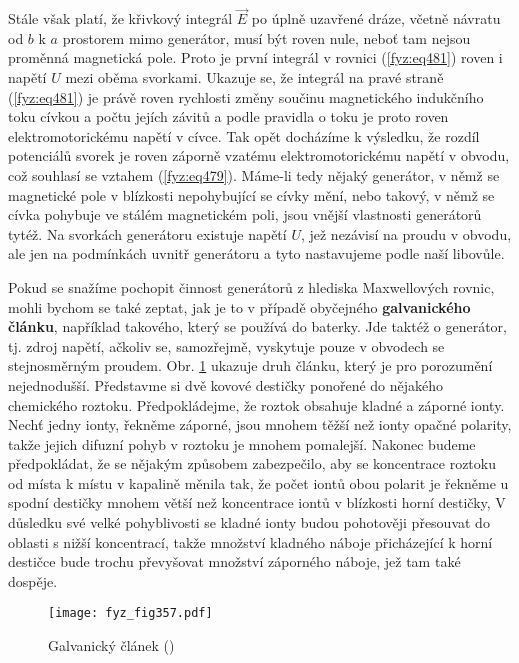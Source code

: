   Stále však platí, že křivkový integrál \(\vec{E}\) po úplně uzavřené dráze, včetně návratu od 
  \(b\) k \(a\) prostorem mimo generátor, musí být roven nule, neboť tam nejsou proměnná magnetická 
  pole. Proto je první integrál v rovnici (\ref{fyz:eq481}) roven i napětí \(U\) mezi oběma 
  svorkami. Ukazuje se, že integrál na pravé straně (\ref{fyz:eq481}) je právě roven rychlosti 
  změny součinu magnetického indukčního toku cívkou a počtu jejích závitů a podle pravidla o toku 
  je proto roven elektromotorickému napětí v cívce. Tak opět docházíme k výsledku, že rozdíl 
  potenciálů svorek je roven záporně vzatému elektromotorickému napětí v obvodu, což souhlasí se 
  vztahem (\ref{fyz:eq479}). Máme-li tedy nějaký generátor, v němž se magnetické pole v blízkosti 
  nepohybující se cívky mění, nebo takový, v němž se cívka pohybuje ve stálém magnetickém poli, 
  jsou vnější vlastnosti generátorů tytéž. Na svorkách generátoru existuje napětí \(U\), jež 
  nezávisí na proudu v obvodu, ale jen na podmínkách uvnitř generátoru a tyto nastavujeme podle 
  naší libovůle. 
  
  Pokud se snažíme pochopit činnost generátorů z hlediska Maxwellových rovnic, mohli bychom se také 
  zeptat, jak je to v případě obyčejného \textbf{galvanického článku}, například takového, který se 
  používá do baterky. Jde taktéž o generátor, tj. zdroj napětí, ačkoliv se, samozřejmě, vyskytuje 
  pouze v obvodech se stejnosměrným proudem. Obr. \ref{fyz:fig357} ukazuje druh článku, který je 
  pro porozumění nejednodušší. Představme si dvě kovové destičky ponořené do nějakého chemického 
  roztoku. Předpokládejme, že roztok obsahuje kladné a záporné ionty. Nechť jedny ionty, řekněme 
  záporné, jsou mnohem těžší než ionty opačné polarity, takže jejich difuzní pohyb v roztoku je 
  mnohem pomalejší. Nakonec budeme předpokládat, že se nějakým způsobem zabezpečilo, aby se 
  koncentrace roztoku od místa k místu v kapalině měnila tak, že počet iontů obou polarit je 
  řekněme u spodní destičky mnohem větší než koncentrace iontů v blízkosti horní destičky, V 
  důsledku své velké pohyblivosti se kladné ionty budou pohotověji přesouvat do oblasti s nižší 
  koncentrací, takže množství kladného náboje přicházející k horní destičce bude trochu převyšovat 
  množství záporného náboje, jež tam také dospěje.

  \begin{figure}[ht!] %
    \centering
    \texttt{[image: fyz\_fig357.pdf]}
    \caption{Galvanický článek
             (\cite[s.~398]{Feynman02})}
    \label{fyz:fig357}
  \end{figure}
  
